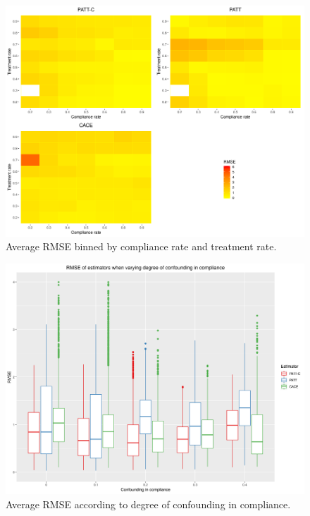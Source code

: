 \documentclass[hidelinks,12pt]{article}
\begin{document}
\pagebreak
\begin{appendices}
	
\newcommand{\hbAppendixPrefix}{A}
%
\renewcommand{\thefigure}{\hbAppendixPrefix\arabic{figure}}
\setcounter{figure}{0}
\renewcommand{\thetable}{\hbAppendixPrefix\arabic{table}} 
\setcounter{table}{0}
\renewcommand{\theequation}{\hbAppendixPrefix\arabic{equation}} 
\setcounter{equation}{0}


\begin{figure}[htbp]
	\begin{center}
		\includegraphics[width = 1\textwidth]{rmse_ratec_ratet.png}
		\caption{Average RMSE binned by compliance rate and treatment rate.\label{fig:rmse_ratec_ratet}}
	\end{center}
\end{figure}

\begin{figure}[htbp]
	\begin{center}
		\includegraphics[width = 1\textwidth]{rmse_boxplots_RateConC.png}
		\caption{Average RMSE according to degree of confounding in compliance.\label{fig:rmse_boxplots_RateConC}}
	\end{center}
\end{figure}


\end{appendices}
\end{document}
